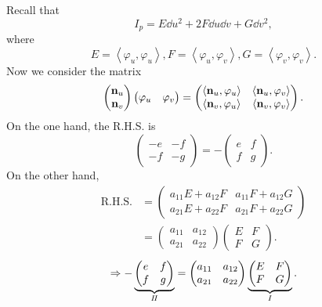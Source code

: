 Recall that 
\[
    I_p=E\dd u^2+2F \dd u\dd v+G\dd v^2,
\]
where
\[
    E=\left\langle\varphi_u,\varphi_u\right\rangle,
    F=\left\langle\varphi_u,\varphi_v\right\rangle,
    G=\left\langle\varphi_v,\varphi_v\right\rangle.    
\]
Now we consider the matrix 
\[
    \begin{pmatrix}
        \vb{n}_u\\
        \vb{n}_v
    \end{pmatrix}
    \begin{pmatrix}
        \varphi_u &\varphi_v
    \end{pmatrix}=
    \begin{pmatrix}
        \left\langle\vb{n}_u,\varphi_u\right\rangle&
        \left\langle\vb{n}_u,\varphi_v\right\rangle\\
        \left\langle\vb{n}_v,\varphi_u\right\rangle&
        \left\langle\vb{n}_v,\varphi_v\right\rangle
    \end{pmatrix}.    
\]
On the one hand, the R.H.S. is 
\[
    \begin{pmatrix}
    -e&-f\\
    -f&-g
    \end{pmatrix}=-
    \begin{pmatrix}
        e&f\\
        f&g
    \end{pmatrix}.
\]
On the other hand,
\begin{align*}
    \text{R.H.S.}&=\begin{pmatrix}
        a_{11}E+a_{12}F&
        a_{11}F+a_{12}G\\
        a_{21}E+a_{22}F&
        a_{21}F+a_{22}G
    \end{pmatrix}\\
    &=\begin{pmatrix}
        a_{11}&a_{12}\\
        a_{21}&a_{22}
    \end{pmatrix}
    \begin{pmatrix}
        E&F\\
        F&G
    \end{pmatrix}.
\end{align*}
\[
    \Rightarrow 
    -\underbrace{\begin{pmatrix}
        e&f\\
        f&g
    \end{pmatrix}}_{I\!I}
    =
    \begin{pmatrix}
        a_{11}&a_{12}\\
        a_{21}&a_{22}
    \end{pmatrix}
    \underbrace{\begin{pmatrix}
        E&F\\
        F&G
    \end{pmatrix}}_{I}.
\]
